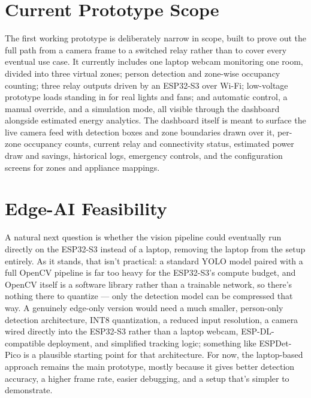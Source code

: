 \documentclass[conference]{IEEEtran}
\begin{document}
\section{Current Prototype Scope}
The first working prototype is deliberately narrow in scope, built to prove out the full path from a camera frame to a switched relay rather than to cover every eventual use case. It currently includes one laptop webcam monitoring one room, divided into three virtual zones; person detection and zone-wise occupancy counting; three relay outputs driven by an ESP32-S3 over Wi-Fi; low-voltage prototype loads standing in for real lights and fans; and automatic control, a manual override, and a simulation mode, all visible through the dashboard alongside estimated energy analytics. The dashboard itself is meant to surface the live camera feed with detection boxes and zone boundaries drawn over it, per-zone occupancy counts, current relay and connectivity status, estimated power draw and savings, historical logs, emergency controls, and the configuration screens for zones and appliance mappings.

\section{Edge-AI Feasibility}
A natural next question is whether the vision pipeline could eventually run directly on the ESP32-S3 instead of a laptop, removing the laptop from the setup entirely. As it stands, that isn't practical: a standard YOLO model paired with a full OpenCV pipeline is far too heavy for the ESP32-S3's compute budget, and OpenCV itself is a software library rather than a trainable network, so there's nothing there to quantize --- only the detection model can be compressed that way. A genuinely edge-only version would need a much smaller, person-only detection architecture, INT8 quantization, a reduced input resolution, a camera wired directly into the ESP32-S3 rather than a laptop webcam, ESP-DL-compatible deployment, and simplified tracking logic; something like ESPDet-Pico is a plausible starting point for that architecture. For now, the laptop-based approach remains the main prototype, mostly because it gives better detection accuracy, a higher frame rate, easier debugging, and a setup that's simpler to demonstrate.
\end{document}
